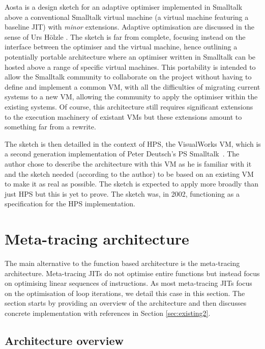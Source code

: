 \documentclass[a4paper,12pt,twoside]{../includes/ThesisStyle}
\begin{document}
Aosta is a design sketch for an adaptive optimiser implemented in Smalltalk above a conventional Smalltalk virtual machine (a virtual machine featuring a baseline JIT) with \emph{minor} extensions. Adaptive optimisation are discussed in the sense of Urs H\"olzle \cite{UrsPHD}. The sketch is far from complete, focusing instead on the interface between the optimiser and the virtual machine, hence outlining a potentially portable architecture where an optimiser written in Smalltalk can be hosted above a range of specific virtual machines. This portability is intended to allow the Smalltalk community to collaborate on the project without having to define and implement a common VM, with all the difficulties of migrating current systems to a new VM, allowing the community to apply the optimiser within the existing systems.  Of course, this architecture still requires significant extensions to the execution machinery of existant VMs but these extensions amount to something far from a rewrite.

The sketch is then detailled in the context of HPS, the VisualWorks VM, which is a second generation implementation of Peter Deutsch's PS Smalltalk~\cite{Deut84a}. The author chose to describe the architecture with this VM as he is familiar with it and the sketch needed (according to the author) to be based on an existing VM to make it as real as possible. The sketch is expected to apply more broadly than just HPS but this is yet to prove. The sketch was, in 2002, functioning as a specification for the HPS implementation. 


\section{Meta-tracing architecture}
\label{sec:metaArchitecture}

The main alternative to the function based architecture is the meta-tracing architecture. Meta-tracing JITs do not optimise entire functions but instead focus on optimising linear sequences of instructions. As most meta-tracing JITs focus on the optimisation of loop iterations, we detail this case in this section. The section starts by providing an overview of the architecture and then discusses concrete implementation with references in Section \ref{sec:existing2}.

\subsection{Architecture overview}
\end{document}
